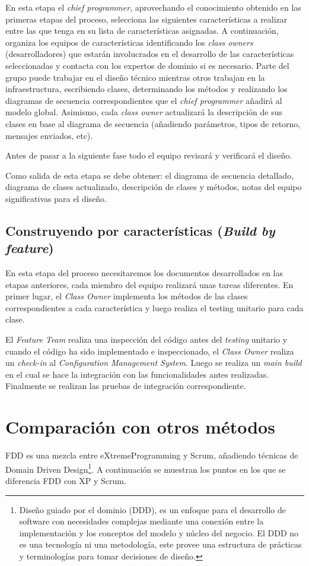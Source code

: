 \documentclass[11pt]{article}
\begin{document}
En esta etapa el \textit{chief programmer}, aprovechando el conocimiento obtenido en las primeras etapas del proceso, selecciona las siguientes características a realizar entre las que tenga en su lista de características asignadas. A continuación, organiza los equipos de características identificando los \textit{class owners} (desarrolladores) que estarán involucrados en el desarrollo de las características seleccionadas y contacta con los expertos de dominio si es necesario. Parte del grupo puede trabajar en el diseño técnico mientras otros trabajan en la infraestructura, escribiendo clases, determinando los métodos y realizando los diagramas de secuencia correspondientes que el \textit{chief programmer} añadirá al modelo global. Asimismo, cada \textit{class owner} actualizará la descripción de sus clases en base al diagrama de secuencia (añadiendo parámetros, tipos de retorno, mensajes enviados, etc).

Antes de pasar a la siguiente fase todo el equipo revisará y verificará el diseño.

Como salida de esta etapa se debe obtener: el diagrama de secuencia detallado, diagrama de clases actualizado, descripción de clases y métodos, notas del equipo significativas para el diseño.

\subsection{Construyendo por características (\textit{Build by feature})}
En esta etapa del proceso necesitaremos los documentos desarrollados en las etapas anteriores, cada miembro del equipo realizará unas tareas diferentes. En primer lugar, el \textit{Class Owner} implementa los métodos de las clases correspondientes a cada característica y luego realiza el testing unitario para cada clase.

El \textit{Feature Team} realiza una inspección del código antes del \textit{testing} unitario y cuando el código ha sido implementado e inspeccionado, el \textit{Class Owner} realiza un \textit{check-in} al \textit{Configuration Management System}. Luego se realiza un \textit{main build} en el cual se hace la integración con las funcionalidades antes realizadas. Finalmente se realizan las pruebas de integración correspondiente.


\section{Comparación con otros métodos}
FDD es una mezcla entre eXtremeProgramming y Scrum, añadiendo técnicas de Domain Driven Design\footnote{Diseño guiado por el dominio (DDD), es un enfoque para el desarrollo de software con necesidades complejas mediante una conexión entre la implementación y los conceptos del modelo y núcleo del negocio. El DDD no es una tecnología ni una metodología, este provee una estructura de prácticas y terminologías para tomar decisiones de diseño.}. A continuación se muestran los puntos en los que se diferencia FDD con XP y Scrum.
\end{document}
